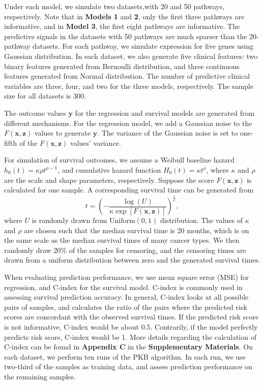 \documentclass[a4paper,12pt]{article}
\newcommand{\bd}[1]{\mathbf{#1}}
\begin{document}
Under each model, we simulate two datasets,with 20 and 50 pathways, respectively. Note that in \textbf{Models 1} and \textbf{2}, only the first three pathways are informative, and in \textbf{Model 3}, the first eight pathways are informative. The predictive signals in the datasets with 50 pathways are much sparser than the 20-pathway datasets. For each pathway, we simulate expression for five genes using Gaussian distribution. In each dataset, we also generate five clinical features: two binary features generated from Bernoulli distribution, and three continuous features generated from Normal distribution. The number of predictive clinical variables are three, four, and two for the three models, respectively. The sample size for all datasets is 300.

The outcome values $\bd{y}$ for the regression and survival models are generated from different mechanisms. For the regression model, we add a Gaussian noise to the $F(\bd{x}, \bd{z})$ values to generate $\bd{y}$. The variance of the Gaussian noise is set to one-fifth of the $F(\bd{x}, \bd{z})$ values' variance.

For simulation of survival outcomes, we assume a Weibull baseline hazard $h_0(t) = \kappa \rho t^{\rho-1}$, and cumulative hazard function $H_0(t) = \kappa t^{\rho}$, where $\kappa$ and $\rho$ are the scale and shape parameters, respectively. Suppose the score $F(\bd{x},\bd{z})$ is calculated for one sample. A corresponding survival time can be generated from
$$t = \left( - \frac{\log(U)}{\kappa \exp[F(\bd{x},\bd{z})]} \right)^{\frac{1}{\rho}},$$
where $U$ is randomly drawn from $\mbox{Uniform}(0,1)$ distribution. \citep{bender2005generating} The values of $\kappa$ and $\rho$ are chosen such that the median survival time is 20 months, which is on the same scale as the median survival times of many cancer types. We then randomly draw 20\% of the samples for censoring, and the censoring times are drawn from a uniform distribution between zero and the generated survival times.

When evaluating prediction performance, we use mean square error (MSE) for regression, and C-index for the survival model.\citep{harrell1982evaluating} C-index is commonly used in assessing survival prediction accuracy. In general, C-index looks at all possible pairs of samples, and calculates the ratio of the pairs where the predicted risk scores are concordant with the observed survival times. If the predicted risk score is not informative, C-index would be about 0.5. Contrarily, if the model perfectly predicts risk score, C-index would be 1. More details regarding the calculation of C-index can be found in \textbf{Appendix C} in the \textbf{Supplementary Materials}. On each dataset, we perform ten runs of the PKB algorithm. In each run, we use two-third of the samples as training data, and assess prediction performance on the remaining samples. 
\end{document}
